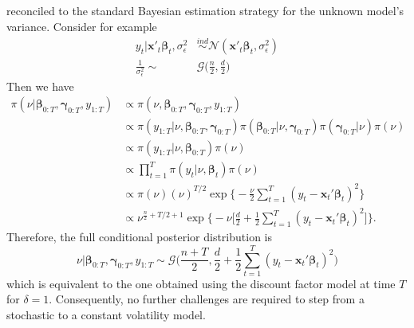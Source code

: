 \documentclass[
  12pt,
]{book}
\theoremstyle{break}
\theoremstyle{nonumberplain}
\begin{document}
reconciled to the standard Bayesian estimation strategy for the unknown
model's variance. Consider for example \begin{align*}
  y_{t}|\boldsymbol{x'}_{t}\boldsymbol{\beta}_{t},\sigma^{2}_{\epsilon} & \overset{ind}{\sim}\mathcal{N}(\boldsymbol{x'}_{t}\boldsymbol{\beta}_{t},\sigma^{2}_{\epsilon}) \\
  \frac{1}{\sigma^{2}_{\epsilon}} \sim & \mathcal{G}\bigg(\frac{n}{2},\frac{d}{2}\bigg)
  \end{align*} Then we have \begin{align*}
\pi(\nu|\boldsymbol{\beta}_{0:T},\boldsymbol{\gamma}_{0:T},y_{1:T})& \propto \pi(\nu,\boldsymbol{\beta}_{0:T},\boldsymbol{\gamma}_{0:T},y_{1:T})\\
&\propto  \pi(y_{1:T}|\nu,\boldsymbol{\beta}_{0:T},\boldsymbol{\gamma}_{0:T})\pi(\boldsymbol{\beta}_{0:T}|\nu,\boldsymbol{\gamma}_{0:T})\pi(\boldsymbol{\gamma}_{0:T}|\nu)\pi(\nu)\\
&\propto  \pi(y_{1:T}|\nu,\boldsymbol{\beta}_{0:T})\pi(\nu)\\
&\propto \prod_{t=1}^{T}\pi(y_{t}|\nu,\boldsymbol{\beta}_{t})\pi(\nu)\\
&\propto \pi(\nu)(\nu)^{T/2}\exp\bigg\{-\frac{\nu}{2}\sum_{t=1}^{T}(y_{t}-\boldsymbol{x}_{t}'\boldsymbol{\beta}_{t})^{2}\bigg\}\\
&\propto \nu^{\frac{n}{2}+T/2+1}\exp\bigg\{-\nu\bigg[\frac{d}{2}+\frac{1}{2}\sum_{t=1}^{T}(y_{t}-\boldsymbol{x}_{t}'\boldsymbol{\beta}_{t})^{2}\bigg]\bigg\}.
\end{align*} Therefore, the full conditional posterior distribution is
\begin{equation*}
\nu|\boldsymbol{\beta}_{0:T},\boldsymbol{\gamma}_{0:T},y_{1:T}\sim\mathcal{G}\bigg(\frac{n+T}{2},\frac{d}{2}+\frac{1}{2}\sum_{t=1}^{T}(y_{t}-\boldsymbol{x}_{t}'\boldsymbol{\beta}_{t})^{2}\bigg)
\end{equation*} which is equivalent to the one obtained using the
discount factor model at time \(T\) for \(\delta=1\). Consequently, no
further challenges are required to step from a stochastic to a constant
volatility model.
\end{document}
